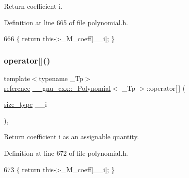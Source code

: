 Return coefficient {\ttfamily i}. 

Definition at line 665 of file polynomial.\+h.


\begin{DoxyCode}
666       \{ \textcolor{keywordflow}{return} this->\_M\_coeff[\_\_i]; \}
\end{DoxyCode}
\mbox{\label{class____gnu__cxx_1_1__Polynomial_a999ee3c5a82fe4b2fa39b7a237ff2cbf}} 
\subsubsection{\texorpdfstring{operator[]()}{operator[]()}\hspace{0.1cm}{\footnotesize\ttfamily [2/2]}}
{\footnotesize\ttfamily template$<$typename \+\_\+\+Tp$>$ \\
\hyperlink{class____gnu__cxx_1_1__Polynomial_accb3b4df60e4ad82d466173d54ea731a}{reference} \hyperlink{class____gnu__cxx_1_1__Polynomial}{\+\_\+\+\_\+gnu\+\_\+cxx\+::\+\_\+\+Polynomial}$<$ \+\_\+\+Tp $>$\+::operator\mbox{[}$\,$\mbox{]} (\begin{DoxyParamCaption}\item[{\hyperlink{class____gnu__cxx_1_1__Polynomial_a8b25fcfd4acaad0c5c08b649c22da28a}{size\+\_\+type}}]{\+\_\+\+\_\+i }\end{DoxyParamCaption})\hspace{0.3cm}{\ttfamily [inline]}, {\ttfamily [noexcept]}}

Return coefficient {\ttfamily i} as an assignable quantity. 

Definition at line 672 of file polynomial.\+h.


\begin{DoxyCode}
673       \{ \textcolor{keywordflow}{return} this->\_M\_coeff[\_\_i]; \}
\end{DoxyCode}
\mbox{\label{class____gnu__cxx_1_1__Polynomial_a10924e0d5e228684c721a4bba73a7af3}} 
